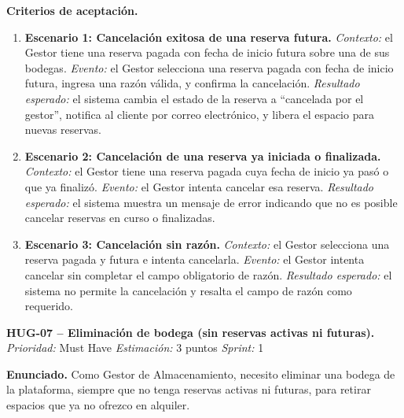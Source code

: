 \textbf{Criterios de aceptación.}
\begin{enumerate}
\item \textbf{Escenario 1: Cancelación exitosa de una reserva futura.} \textit{Contexto:} el Gestor tiene una reserva pagada con fecha de inicio futura sobre una de sus bodegas. \textit{Evento:} el Gestor selecciona una reserva pagada con fecha de inicio futura, ingresa una razón válida, y confirma la cancelación. \textit{Resultado esperado:} el sistema cambia el estado de la reserva a ``cancelada por el gestor'', notifica al cliente por correo electrónico, y libera el espacio para nuevas reservas.
\item \textbf{Escenario 2: Cancelación de una reserva ya iniciada o finalizada.} \textit{Contexto:} el Gestor tiene una reserva pagada cuya fecha de inicio ya pasó o que ya finalizó. \textit{Evento:} el Gestor intenta cancelar esa reserva. \textit{Resultado esperado:} el sistema muestra un mensaje de error indicando que no es posible cancelar reservas en curso o finalizadas.
\item \textbf{Escenario 3: Cancelación sin razón.} \textit{Contexto:} el Gestor selecciona una reserva pagada y futura e intenta cancelarla. \textit{Evento:} el Gestor intenta cancelar sin completar el campo obligatorio de razón. \textit{Resultado esperado:} el sistema no permite la cancelación y resalta el campo de razón como requerido.
\end{enumerate}

\textbf{HUG-07 -- Eliminación de bodega (sin reservas activas ni futuras).} \label{req:HUG-07}
\textit{Prioridad:} Must Have \quad \textit{Estimación:} 3 puntos \quad \textit{Sprint:} 1

\textbf{Enunciado.} Como Gestor de Almacenamiento, necesito eliminar una bodega de la plataforma, siempre que no tenga reservas activas ni futuras, para retirar espacios que ya no ofrezco en alquiler.

